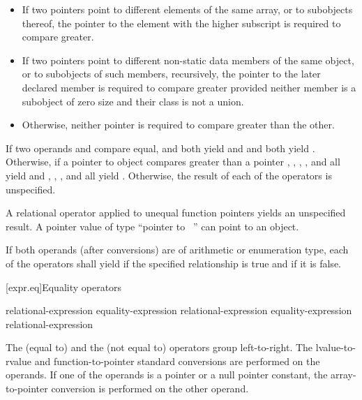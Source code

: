 \begin{itemize}
\item If two pointers point to different elements of the same array, or to
subobjects thereof, the pointer to the element with the higher subscript
is required to compare greater.

\item If two pointers point to different non-static data members of the same
object, or to subobjects of such members, recursively,
the pointer to the later declared member is required to compare greater provided
neither member is a subobject of zero size
and their class is not a union.

\item Otherwise, neither pointer is required to compare greater than the other.

\end{itemize}

\pnum
If two operands  and  compare equal,
 and  both yield  and  and
 both yield . Otherwise, if a pointer to object 
compares greater than a pointer , , ,
, and  all yield  and ,
, , and  all yield .
Otherwise, the result of each of the operators is unspecified.
\begin{note}
A relational operator applied
to unequal function pointers
yields an unspecified result.
A pointer value of type ``pointer to \cv{}~''
can point to an object.
\end{note}

\pnum
If both operands (after conversions) are of arithmetic or enumeration type, each
of the operators shall yield  if the specified relationship is true
and  if it is false.

[expr.eq]{Equality operators}%
%
%

\begin{bnf}
\br
    relational-expression\br
    equality-expression \terminal{==} relational-expression\br
    equality-expression \terminal{!=} relational-expression
\end{bnf}

\pnum
The \tcode{==} (equal to) and the \tcode{!=} (not equal to) operators
group left-to-right.
The
lvalue-to-rvalue
and function-to-pointer
standard conversions are performed on the operands.
If one of the operands is a pointer or a null pointer constant,
the array-to-pointer conversion is performed
on the other operand.

